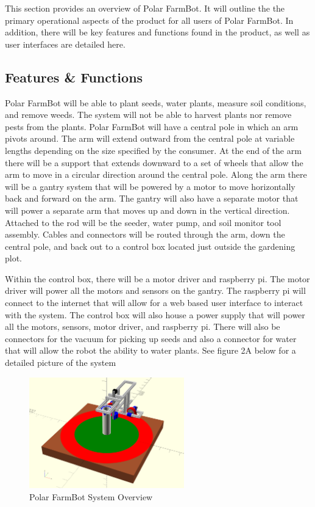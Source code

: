 This section provides an overview of Polar FarmBot. It will outline the the primary operational aspects of the product for all users of Polar FarmBot. In addition, there will be key features and functions found in the product, as well as user interfaces are detailed here.

\subsection{Features \& Functions}
Polar FarmBot will be able to plant seeds, water plants, measure soil conditions, and remove weeds. The system will not be able to harvest plants nor remove pests from the plants. Polar FarmBot will have a central pole in which an arm pivots around. The arm will extend outward from the central pole at variable lengths depending on the size specified by the consumer. At the end of the arm there will be a support that extends downward to a set of wheels that allow the arm to move in a circular direction around the central pole. Along the arm there will be a gantry system that will be powered by a motor to move horizontally back and forward on the arm. The gantry will also have a separate motor that will power a separate arm that moves up and down in the vertical direction. Attached to the rod will be the seeder, water pump, and soil monitor tool assembly. Cables and connectors will be routed through the arm, down the central pole, and back out to a control box located just outside the gardening plot.

Within the control box, there will be a motor driver and raspberry pi. The motor driver will power all the motors and sensors on the gantry. The raspberry pi will connect to the internet that will allow for a web based user interface to interact with the system. The control box will also house a power supply that will power all the motors, sensors, motor driver, and raspberry pi. There will also be connectors for the vacuum for picking up seeds and also a connector for water that will allow the robot the ability to water plants. See figure 2A below for a detailed picture of the system

\begin{figure}[h!]
	\centering
   	\includegraphics[width=0.60\textwidth]{images/farmbot}
    \caption{Polar FarmBot System Overview}
\end{figure}

